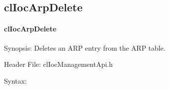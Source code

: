 \begin{flushleft}
\subsection{clIocArpDelete}
\hypertarget{pageioc209}{}\paragraph{cl\-Ioc\-Arp\-Delete}\label{pageioc209}
\begin{Desc}
\item[Synopsis:]Deletes an ARP entry from the ARP table.\end{Desc}
\begin{Desc}
\item[Header File:]clIocManagementApi.h\end{Desc}
\begin{Desc}
\item[Syntax:]


\end{Desc}
\end{flushleft}

